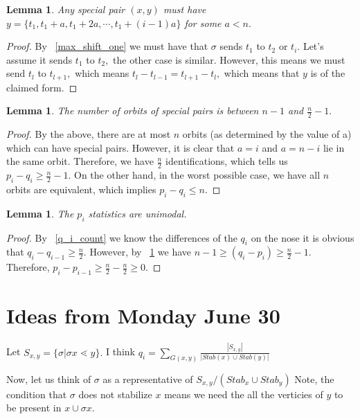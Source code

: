 \documentclass{amsart}
\newtheorem{lem}[subsubsection]{Lemma}
\begin{document}
\begin{lem}
Any special pair $(x,y)$ must have $y = \{t_1,t_1+a,t_1 + 2a,\cdots,t_1+(i-1)a\}$ for some $a < n.$
\end{lem}
\begin{proof}
By ~\ref{max_shift_one} we must have that $\sigma$ sends $t_1$ to $t_2$ or $t_i.$ Let's assume it sends $t_1$ to $t_2,$ the other case is similar. However, this means we must send $t_l$ to $t_{l+1},$ which means $t_l - t_{l-1} = t_{l+1} - t_l,$ which means that $y$ is of the claimed form.
\end{proof}



\begin{lem}
\label{bound_special_orbits}
The number of orbits of special pairs is between $n-1$ and $\frac{n}{2}-1.$
\end{lem}
\begin{proof}
By the above, there are at most $n$ orbits (as determined by the value of a) which can have special pairs. However, it is clear that $a = i$ and $a = n-i$ lie in the same orbit. Therefore, we have $\frac{n}{2}$ identifications, which tells us $p_i - q_i \geq \frac{n}{2}-1.$
On the other hand, in the worst possible case, we have all $n$ orbits are equivalent, which implies $p_i - q_i \leq n.$
\end{proof}

\begin{lem}
The $p_i$ statistics are unimodal.
\end{lem}
\begin{proof}
By ~\ref{q_i_count} we know the differences of the $q_i$ on the nose it is obvious that $q_i - q_{i-1}\geq \frac{n}{2}.$ However, by ~\ref{bound_special_orbits} we have $n-1 \geq (q_i - p_i) \geq \frac{n}{2}-1.$ Therefore, $p_i - p_{i-1} \geq \frac{n}{2}-\frac{n}{2} \geq 0.$
\end{proof}

\section{Ideas from Monday June 30}

Let $S_{x,y} = \{\sigma|\sigma x\lessdot y\}.$
I think $q_i = \sum_{G(x,y)}^{} \frac{|S_{x,y}|}{|Stab(x)\cup Stab(y)|}$

Now, let us think of $\sigma$ as a representative of $S_{x,y}/(Stab_x \cup Stab_y)$
Note, the condition that $\sigma$ does not stabilize $x$ means we need the all the verticies of $y$ to be present in $x \cup \sigma x.$
\end{document}

